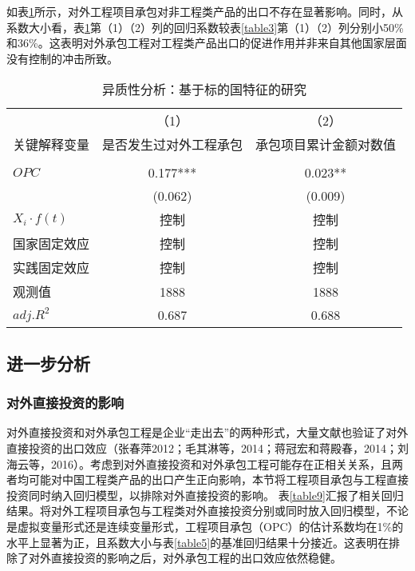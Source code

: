 \documentclass[a4paper,12pt]{article}
\newcommand{\upcite}[1]{\textsuperscript{\textsuperscript{\cite{#1}}}}
\newcommand{\sym}[1]{#1}
\begin{document}
\vspace{0.5em}  %

如表\ref{table8}所示，对外工程项目承包对非工程类产品的出口不存在显著影响。同时，从系数大小看，表\ref{table8}第（1）（2）列的回归系数较表\ref{table3}第（1）（2）列分别小50\%和36\%。这表明对外承包工程对工程类产品出口的促进作用并非来自其他国家层面没有控制的冲击所致。

\begin{table} [ht] \footnotesize
	\newcommand{\tabincell}[2]{\begin{tabular}{@{}#1@{}}#2\end{tabular}}  %
	\centering
	\captionsetup{labelformat=default,labelsep=period}
	\caption{异质性分析：基于标的国特征的研究}\label{table8}
	\begin{tabular}{lcc}
		\toprule
		&（1）&（2）\\
		关键解释变量	&是否发生过对外工程承包&承包项目累计金额对数值 \\	
		\cline{1-3} \\
		\vspace{0.05em}  %
		$OPC$ &0.177\sym{***} & 0.023\sym{**} \\
		&(0.062)   	  &(0.009)     \\
		$X_{i}·f(t)$  & 控制&控制   \\
		国家固定效应  & 控制&控制  \\
		实践固定效应  & 控制&控制   \\
		观测值 &1888&1888\\
		$adj.R^{2}$ &0.687&	0.688\\
		\bottomrule
	\end{tabular}
\end{table}

\subsection{进一步分析}
\subsubsection{对外直接投资的影响}
对外直接投资和对外承包工程是企业“走出去”的两种形式，大量文献也验证了对外直接投资的出口效应（张春萍2012；毛其淋等，2014；蒋冠宏和蒋殿春，2014；刘海云等，2016）\upcite{ref13}\upcite{ref14}\upcite{ref15}\upcite{ref16}。考虑到对外直接投资和对外承包工程可能存在正相关关系，且两者均可能对中国工程类产品的出口产生正向影响，本节将工程项目承包与工程直接投资同时纳入回归模型，以排除对外直接投资的影响。
表\ref{table9}汇报了相关回归结果。将对外工程项目承包与工程类对外直接投资分别或同时放入回归模型，不论是虚拟变量形式还是连续变量形式，工程项目承包（OPC）的估计系数均在1\%的水平上显著为正，且系数大小与表\ref{table5}的基准回归结果十分接近。这表明在排除了对外直接投资的影响之后，对外承包工程的出口效应依然稳健。
\end{document}
